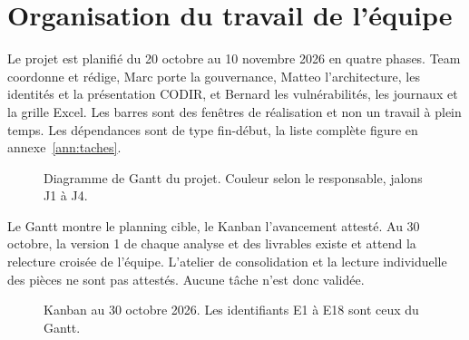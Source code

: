 \section{Organisation du travail de l'équipe}
\label{sec:organisation}

Le projet est planifié du 20 octobre au 10 novembre 2026 en quatre phases. Team coordonne et rédige, Marc porte la gouvernance, Matteo l'architecture, les identités et la présentation CODIR, et Bernard les vulnérabilités, les journaux et la grille Excel. Les barres sont des fenêtres de réalisation et non un travail à plein temps. Les dépendances sont de type fin-début, la liste complète figure en annexe~\ref{ann:taches}.

\begin{figure}[H]
\centering
\resizebox{\linewidth}{!}{}
\caption{Diagramme de Gantt du projet. Couleur selon le responsable, jalons J1 à J4.}
\end{figure}

Le Gantt montre le planning cible, le Kanban l'avancement attesté. Au 30 octobre, la version 1 de chaque analyse et des livrables existe et attend la relecture croisée de l'équipe. L'atelier de consolidation et la lecture individuelle des pièces ne sont pas attestés. Aucune tâche n'est donc validée.

\begin{figure}[H]
\centering
\resizebox{\linewidth}{!}{}
\caption{Kanban au 30 octobre 2026. Les identifiants E1 à E18 sont ceux du Gantt.}
\end{figure}
